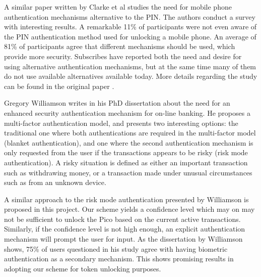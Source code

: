 A similar paper \cite{clarke2002acceptance} written by Clarke et al studies the need for mobile phone authentication mechanisms alternative to the PIN. The authors conduct a survey with interesting results. A remarkable 11\% of participants were not even aware of the PIN authentication method used for unlocking a mobile phone. An average of 81\% of participants agree that different mechanisms should be used, which provide more security. Subscribes have reported both the need and desire for using alternative authentication mechanisms, but at the same time many of them do not use available alternatives available today. More details regarding the study can be found in the original paper \cite{clarke2002acceptance}.

Gregory Williamson writes in his PhD dissertation \cite{williamson2006enhanced} about the need for an enhanced security authentication mechanism for on-line banking. He proposes a multi-factor authentication model, and presents two interesting options: the traditional one where both authentications are required in the multi-factor model (blanket authentication), and one where the second authentication mechanism is only requested from the user if the transactions appears to be risky (risk mode authentication). A risky situation is defined as either an important transaction such as withdrawing money, or a transaction made under unusual circumstances such as from an unknown device. 

A similar approach to the risk mode authentication presented by Williamson \cite{williamson2006enhanced} is proposed in this project. Our scheme yields a confidence level which may on may not be sufficient to unlock the Pico based on the current active transactions. Similarly, if the confidence level is not high enough, an explicit authentication mechanism will prompt the user for input. As the dissertation by Williamson shows, 75\% of users questioned in his study agree with having biometric authentication as a secondary mechanism. This shows promising results in adopting our scheme for token unlocking purposes.


